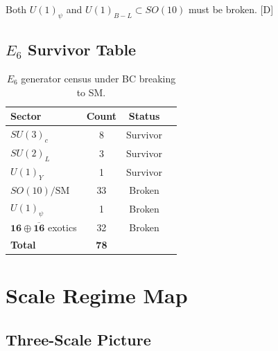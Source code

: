 \documentclass[11pt,a4paper]{article}
\newcommand{\tagD}{\textcolor{blue!70!black}{[D]}}
\begin{document}
Both $U(1)_\psi$ and $U(1)_{B-L} \subset SO(10)$ must be broken. \tagD

\subsection{$E_6$ Survivor Table}

\begin{table}[h]
\centering
\begin{tabular}{lccc}
\toprule
Sector & Count & Status \\
\midrule
$SU(3)_c$ & 8 & Survivor \\
$SU(2)_L$ & 3 & Survivor \\
$U(1)_Y$ & 1 & Survivor \\
$SO(10)/\text{SM}$ & 33 & Broken \\
$U(1)_\psi$ & 1 & Broken \\
$\mathbf{16} \oplus \overline{\mathbf{16}}$ exotics & 32 & Broken \\
\midrule
\textbf{Total} & \textbf{78} & \\
\bottomrule
\end{tabular}
\caption{$E_6$ generator census under BC breaking to SM.}
\label{tab:e6}
\end{table}

\section{Scale Regime Map}

\subsection{Three-Scale Picture}
\end{document}
